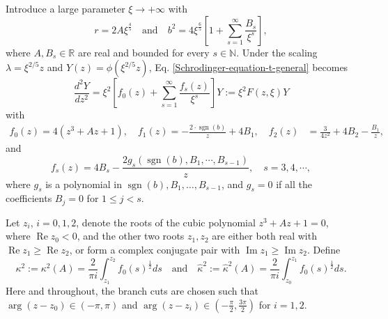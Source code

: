 \documentclass[12pt]{article}
\theoremstyle{plain}
\theoremstyle{definition}
\numberwithin{equation}{section}
\renewcommand\Re{\operatorname{Re}}
\renewcommand\Im{\operatorname{Im}}
\newcommand\sgn{\operatorname{sgn}}
\begin{document}
Introduce a large parameter $\xi\to+\infty$ with
\begin{equation}\label{para-a-b-xi}
r=2A\xi^{\frac{4}{5}} \quad\text{and}\quad
b^2=4\xi^{\frac{6}{5}}\left[1+\sum\limits_{s=1}^{\infty}\frac{B_{s}}{\xi^{s}}\right],
\end{equation}
where $A, B_{s}\in\mathbb{R}$ are real and bounded for every $s\in\mathbb{N}$.
Under the scaling $\lambda=\xi^{2/5}z$ and $Y(z)=\phi(\xi^{2/5}z)$, Eq. \eqref{Schrodinger-equation-t-general} becomes
\begin{equation}\label{second-order-equation-w}
\frac{d^{2}Y}{dz^2}
=\xi^2 \left[f_{0}(z)+\sum\limits_{s=1}^{\infty}\frac{f_{s}(z)}{\xi^{s}}\right]Y
:=\xi^2 F(z,\xi) Y
\end{equation}
with
\begin{equation}
\begin{split}
f_{0}(z)=4(z^3+Az+1),\quad f_{1}(z)=-\frac{2\cdot\sgn(b)}{z}+4B_{1}, \quad
f_{2}(z)&=\frac{3}{4z^2}+4B_{2}-\frac{B_{1}}{z},
\end{split}
\end{equation}
and
\begin{equation}\label{eq-def-fs}
f_{s}(z)=4B_{s}-\frac{2g_{s}(\sgn(b), B_{1},\cdots,B_{s-1})}{z}, \quad s=3,4,\cdots,
\end{equation}
where $g_{s}$ is a polynomial in $\sgn(b), B_{1}, \ldots, B_{s-1}$, and $g_{s} = 0$ if all the coefficients $B_{j} = 0$ for $1 \leq j < s$.

Let $z_{i}$, $i = 0, 1, 2$, denote the roots of the cubic polynomial $z^{3} + Az + 1 = 0$, where $\Re z_{0} < 0$, and the other two roots $z_{1}, z_{2}$ are either both real with $\Re z_{1} \geq \Re z_{2}$, or form a complex conjugate pair with $\Im z_{1} \geq \Im z_{2}$. Define
\begin{equation}\label{eq-def-kappa2-hat-kappa2}
\kappa^2:=\kappa^{2}(A)=\frac{2}{\pi i}\int_{z_{1}}^{z_{2}}f_{0}(s)^{\frac{1}{2}}ds
\quad \text{and}\quad
\widehat{\kappa}^2:=\widehat{\kappa}^{2}(A)=\frac{2}{\pi i}\int_{z_{0}}^{z_{1}}f_{0}(s)^{\frac{1}{2}}ds.
\end{equation}
Here and throughout, the branch cuts are chosen such that $\arg(z - z_{0}) \in (-\pi, \pi)$ and $\arg(z - z_{i}) \in \left(-\frac{\pi}{2}, \frac{3\pi}{2}\right)$ for $i = 1, 2$.
\end{document}
